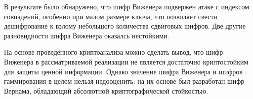 В результате было обнаружено, что шифр Виженера подвержен атаке с индексом совпадений, особенно при малом размере ключа, что позволяет свести дешифрование к взлому небольшого количества сдвиговых шифров. Две другие разновидности шифра Виженера оказалсь нестойкими.  

На основе проведённого криптоанализа можно сделать вывод, что шифр Виженера в рассматриваемой реализации не является достаточно криптостойким для защиты ценной информации. Однако значение шифра Виженера и шифров гаммирования в целом нельзя недооценить: на их основе был разработан шифр Вернама, обладающий абсолютной криптографической стойкостью.

